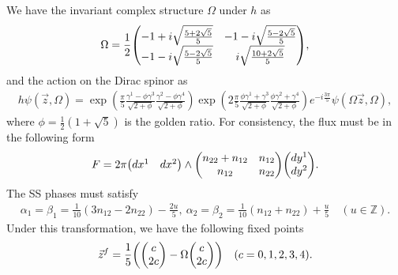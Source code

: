 \documentclass[11pt]{article}
\begin{document}
We have the invariant complex structure $\Omega$ under $h$ as
\begin{align}
    \Omega= \frac{1}{2} \mqty(- 1+  i\sqrt{ \frac{5 + 2 \sqrt{5}}{5}} &-1 -i \sqrt{ \frac{5 - 2 \sqrt{5}}{5}} \\-1 -i\sqrt{ \frac{5 - 2 \sqrt{5}}{5}} & i\sqrt{ \frac{10 + 2 \sqrt{5}}{5}} ) ,
\end{align}
and the action on the Dirac spinor as
\begin{align}
    h\psi(\vec{z},\Omega)= \exp(\frac{\pi}{5} \frac{\gamma^1 -\phi \gamma^3}{\sqrt{2+ \phi} } \frac{\gamma^2 -\phi \gamma^4}{\sqrt{2+ \phi} }  ) \exp(2\frac{\pi}{5} \frac{\phi \gamma^1 + \gamma^3}{\sqrt{2+ \phi} } \frac{\phi \gamma^2 +\gamma^4}{\sqrt{2+ \phi} }  ) 
e^{-i \frac{3\pi}{5}} \psi( \Omega\vec{z},\Omega),
\end{align}
where $\phi=\frac{1}{2}(1+ \sqrt{5})$ is the golden ratio.
For consistency, the flux must be in the following form
\begin{align}
    F= 2\pi  \mqty(dx^1 & dx^2) \wedge \mqty( n_{22}+ n_{12} & n_{12} \\ n_{12} & n_{22} ) \mqty(dy^1 \\ dy^2).
\end{align}
The SS phases must satisfy
\begin{align}
    \alpha_1=\beta_1= \frac{1}{10}(3n_{12}- 2 n_{22})-\frac{2u}{5},~\alpha_2=\beta_2= \frac{1}{10}(n_{12}+n_{22}) +\frac{u}{5}\quad (u \in \mathbb{Z}).
\end{align}
Under this transformation, we have the following fixed points
\begin{align}
    \vec{z}^f= \frac{1}{5} \qty( \mqty(c \\ 2c) -\Omega \mqty(c \\ 2c))\quad (c=0,1,2,3,4).
\end{align}
\end{document}
